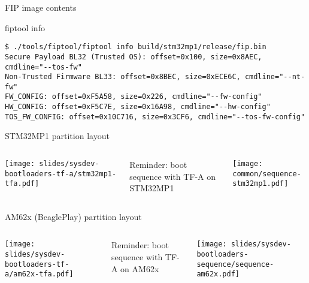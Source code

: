 \begin{frame}[fragile]{FIP image contents}
  \begin{block}{fiptool info}
    {\footnotesize
\begin{verbatim}
$ ./tools/fiptool/fiptool info build/stm32mp1/release/fip.bin
Secure Payload BL32 (Trusted OS): offset=0x100, size=0x8AEC, cmdline="--tos-fw"
Non-Trusted Firmware BL33: offset=0x8BEC, size=0xECE6C, cmdline="--nt-fw"
FW_CONFIG: offset=0xF5A58, size=0x226, cmdline="--fw-config"
HW_CONFIG: offset=0xF5C7E, size=0x16A98, cmdline="--hw-config"
TOS_FW_CONFIG: offset=0x10C716, size=0x3CF6, cmdline="--tos-fw-config"
\end{verbatim}
    }
  \end{block}
\end{frame}

\begin{frame}{STM32MP1 partition layout}
  \begin{columns}
  \begin{center}
    \texttt{[image: slides/sysdev-bootloaders-tf-a/stm32mp1-tfa.pdf]}
  \end{center}
  \small Reminder: boot sequence with TF-A on STM32MP1
  \begin{center}
    \texttt{[image: common/sequence-stm32mp1.pdf]}
  \end{center}
  \end{columns}
\end{frame}

\begin{frame}{AM62x (BeaglePlay) partition layout}
  \begin{columns}
  \begin{center}
    \texttt{[image: slides/sysdev-bootloaders-tf-a/am62x-tfa.pdf]}
  \end{center}
  \small Reminder: boot sequence with TF-A on AM62x
  \begin{center}
    \texttt{[image: slides/sysdev-bootloaders-sequence/sequence-am62x.pdf]}
  \end{center}
  \end{columns}
\end{frame}

